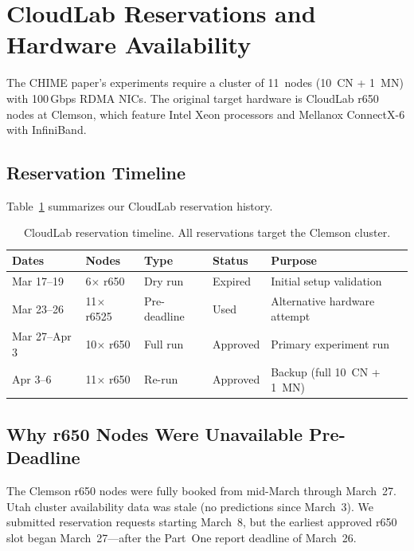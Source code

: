 \documentclass[11pt,a4paper]{article}
\begin{document}
\section{CloudLab Reservations and Hardware Availability}
\label{sec:reservations}

The CHIME paper's experiments require a cluster of 11~nodes (10~CN + 1~MN) with 100\,Gbps RDMA NICs. The original target hardware is CloudLab r650 nodes at Clemson, which feature Intel Xeon processors and Mellanox ConnectX-6 with InfiniBand.

\subsection{Reservation Timeline}

Table~\ref{tab:reservations} summarizes our CloudLab reservation history.

\begin{table}[H]
\centering
\caption{CloudLab reservation timeline. All reservations target the Clemson cluster.}
\label{tab:reservations}
\begin{tabular}{@{}llllp{4cm}@{}}
\toprule
\textbf{Dates} & \textbf{Nodes} & \textbf{Type} & \textbf{Status} & \textbf{Purpose} \\
\midrule
Mar 17--19 & 6$\times$ r650 & Dry run & Expired & Initial setup validation \\
Mar 23--26 & 11$\times$ r6525 & Pre-deadline & Used & Alternative hardware attempt \\
Mar 27--Apr 3 & 10$\times$ r650 & Full run & Approved & Primary experiment run \\
Apr 3--6 & 11$\times$ r650 & Re-run & Approved & Backup (full 10~CN + 1~MN) \\
\bottomrule
\end{tabular}
\end{table}

\subsection{Why r650 Nodes Were Unavailable Pre-Deadline}

The Clemson r650 nodes were fully booked from mid-March through March~27. Utah cluster availability data was stale (no predictions since March~3). We submitted reservation requests starting March~8, but the earliest approved r650 slot began March~27---after the Part~One report deadline of March~26.
\end{document}

